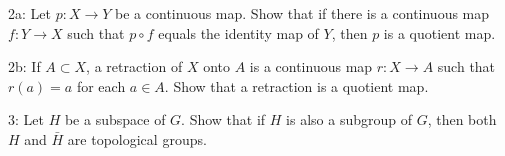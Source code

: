 \documentclass{article}
\begin{document}
2a: Let $p: X \rightarrow Y$ be a continuous map. Show that if there is a continuous map $f: Y \rightarrow X$ such that $p \circ f$ equals the identity map of $Y$, then $p$ is a quotient map.

2b: If $A \subset X$, a retraction of $X$ onto $A$ is a continuous map $r: X \rightarrow A$ such that $r(a)=a$ for each $a \in A$. Show that a retraction is a quotient map.

3: Let $H$ be a subspace of $G$. Show that if $H$ is also a subgroup of $G$, then both $H$ and $\bar{H}$ are topological groups.
\end{document}
